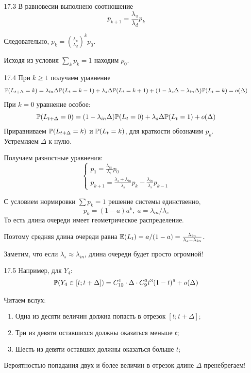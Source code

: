 \protect \hypertarget {soln:17.3}{}
\begin{solution}{{17.3}}
В равновесии выполнено соотношение
\[
p_{k+1} = \frac{\lambda_u}{\lambda_d} p_k
\]

Следовательно, $p_k = \left( \frac{\lambda_u}{\lambda_d}  \right)^k p_0$.

Исходя из условия $\sum_k p_k = 1$ находим $p_0$.

\end{solution}
\protect \hypertarget {soln:17.4}{}
\begin{solution}{{17.4}}
  При $k\geq 1$ получаем уравнение
  \[
     \P(L_{t+\Delta} = k) = \lambda_{in}\Delta \P(L_t = k-1) + \lambda_s \Delta \P(L_t = k + 1) + (1-\lambda_s \Delta - \lambda_{in}\Delta) \P(L_t = k) = o(\Delta)
  \]
  При $k=0$ уравнение особое:
  \[
     \P(L_{t+\Delta} = 0) = (1 - \lambda_{in}\Delta) \P(L_t = 0) + \lambda_s \Delta \P(L_t = 1) + o(\Delta)
  \]
  Приравниваем $\P(L_{t+\Delta} = k)$ и $\P(L_t = k)$, для краткости обозначим $p_k$. Устремляем $\Delta$ к нулю.

  Получаем разностные уравнения:
  \[
  \begin{cases}
    p_1 = \frac{\lambda_{in}}{\lambda_s} p_0 \\
    p_{k+1} = \frac{\lambda_s + \lambda_{in}}{\lambda_s} p_k - \frac{\lambda_{in}}{\lambda_s}p_{k-1}
  \end{cases}
  \]

  С условием нормировки $\sum p_k = 1$ решение системы единственно,
  \[
      p_k = (1 - a)a^k, \; a = \lambda_{in}/\lambda_s
  \]
  То есть длина очереди имеет геометрическое распределение.

  Поэтому средняя длина очереди равна $\E(L_t) = a/(1-a)=\frac{\lambda_{in}}{\lambda_s - \lambda_{in}}$.

  Заметим, что если $\lambda_s \approx \lambda_{in}$, длина очереди будет просто огромной!
\end{solution}
\protect \hypertarget {soln:17.5}{}
\begin{solution}{{17.5}}
  Например, для $Y_4$:
  \[
    \P(Y_4 \in [t; t+\Delta]) = C_{10}^1 \cdot \Delta \cdot C_{9}^3 t^3 (1-t)^6 + o(\Delta)
  \]

  Читаем вслух:
  \begin{enumerate}
    \item Одна из десяти величин должна попасть в отрезок $[t; t + \Delta]$;
    \item Три из девяти оставшихся должны оказаться меньше $t$;
    \item Шесть из девяти оставших должны оказаться больше $t$;
  \end{enumerate}
  Вероятностью попадания двух и более величин в отрезок длине $\Delta$ пренебрегаем!
\end{solution}
